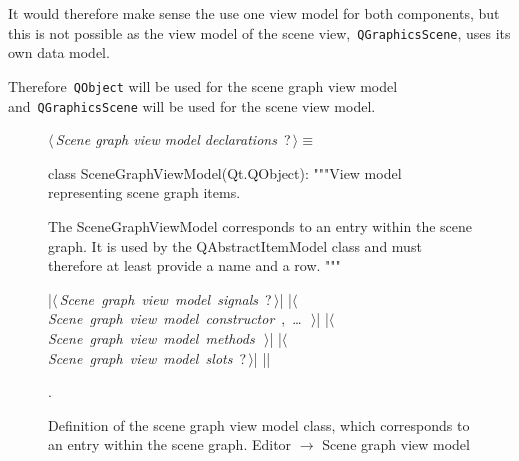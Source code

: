 \documentclass[%
    a4paper,    %
    justified,  %
    nobib,      %
    openany     %
]{tufte-book}
\makeatletter
\renewcommand{\label}[1]{\@tufte@label{##1}}%
\makeatother
\begin{document}
It would therefore make sense the use one view model for both components, but
this is not possible as the view model of the scene view,~\verb=QGraphicsScene=,
uses its own data model.

Therefore~\verb=QObject= will be used for the scene graph view model
and~\verb=QGraphicsScene= will be used for the scene view model.

\begin{figure}
\begin{flushleft} \small
\begin{minipage}{\linewidth}\label{scrap23}\raggedright\small
{} $\langle\,${\itshape Scene graph view model declarations}\nobreak\ {\footnotesize {?}}$\,\rangle\equiv$
\vspace{-1ex}
\begin{pythoncode}
class SceneGraphViewModel(Qt.QObject):
    """View model representing scene graph items.

    The SceneGraphViewModel corresponds to an entry within the
    scene graph. It is used by the QAbstractItemModel class and
    must therefore at least provide a name and a row.
    """

    |\hbox{$\langle\,${\itshape Scene graph view model signals}\nobreak\ {\footnotesize ?}$\,\rangle$}|
    |\hbox{$\langle\,${\itshape Scene graph view model constructor}\nobreak\ {\footnotesize {}, \ldots\ }$\,\rangle$}|
    |\hbox{$\langle\,${\itshape Scene graph view model methods}\nobreak\ {\footnotesize {}}$\,\rangle$}|
    |\hbox{$\langle\,${\itshape Scene graph view model slots}\nobreak\ {\footnotesize ?}$\,\rangle$}|
|\NWsep|
\end{pythoncode}
\vspace{1.5ex}
\footnotesize
\begin{list}{}{\setlength{\itemsep}{-\parsep}\setlength{\itemindent}{-\leftmargin}}
\item {\NWtxtMacroNoRef}.

\item{}
\end{list}
\end{minipage}\vspace{4ex}
\end{flushleft}
\caption{Definition of the scene graph view model class, which corresponds to an
  entry within the scene graph.
  \newline{}\newline{}Editor $\rightarrow$ Scene graph view model}
\label{editor:lst:scene-graph-view-model}
\end{figure}
\end{document}
